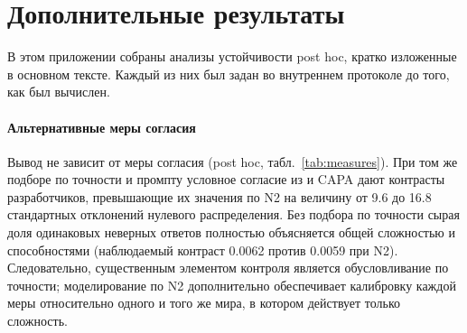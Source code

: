 \documentclass[preprint,12pt,authoryear]{elsarticle}
\begin{document}
\section{Дополнительные результаты}
\label{sec:supp}
\normalsize
В этом приложении собраны анализы устойчивости post hoc, кратко изложенные в основном тексте. Каждый из них был задан во внутреннем протоколе до того, как был вычислен.

\paragraph{Альтернативные меры согласия} Вывод не зависит от меры согласия (post hoc, табл.~\ref{tab:measures}). При том же подборе по точности и промпту условное согласие из \citet{kim2025correlated} и CAPA \citep{goel2025great} дают контрасты разработчиков, превышающие их значения по N2 на величину от 9.6 до 16.8 стандартных отклонений нулевого распределения. Без подбора по точности сырая доля одинаковых неверных ответов полностью объясняется общей сложностью и способностями (наблюдаемый контраст 0.0062 против 0.0059 при N2). Следовательно, существенным элементом контроля является обусловливание по точности; моделирование по N2 дополнительно обеспечивает калибровку каждой меры относительно одного и того же мира, в котором действует только сложность.

\begin{table}[!htbp]
\centering
\caption{Контраст разработчиков для H1 при альтернативных мерах согласия (MMLU, 70 моделей; post hoc). Наблюдаемый контраст, его среднее по отдельному набору из 200 панелей N2 и $z = $ (наблюдаемое $-$ среднее по N2)/стандартное отклонение по N2.}
\label{tab:measures}
\small
{}
\end{table}
\end{document}
